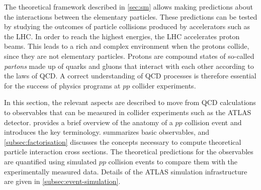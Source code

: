 
The theoretical framework described in \cref{sec:sm} allows making predictions about the interactions between the elementary particles. 
These predictions can be tested by studying the outcomes of particle collisions produced by accelerators such as the LHC. 
In order to reach the highest energies, the LHC accelerates proton beams. 
This leads to a rich and complex environment when the protons collide, since they are not elementary particles.
Protons are compound states of so-called \emph{partons} made up of quarks and gluons that interact with each other according to the laws of QCD.
A correct understanding of QCD processes is therefore essential for the success of physics programs at $pp$ collider experiments.

In this section, the relevant aspects are described to move from QCD calculations to observables that can be measured in collider experiments such as the ATLAS detector.
 provides a brief overview of the anatomy of a $pp$ collision event and introduces the key terminology.  summarizes basic observables, and \cref{subsec:factorisation} discusses the concepts necessary to compute theoretical particle interaction cross sections.
The theoretical predictions for the observables are quantified using simulated $pp$ collision events to compare them with the experimentally measured data. Details of the ATLAS simulation infrastructure are given in \cref{subsec:event-simulation}. 




